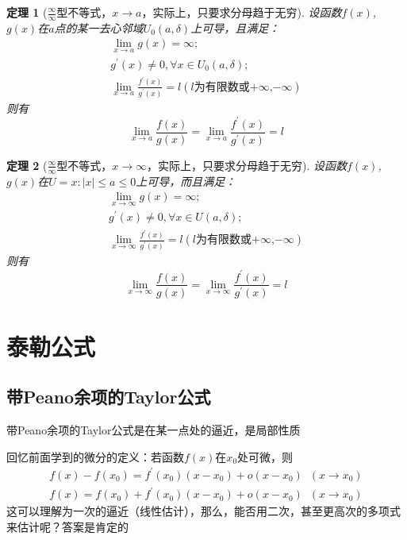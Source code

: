 \documentclass[12pt, a4paper, oneside]{ctexart}
\newtheorem{theorem}{定理}[section]
\begin{document}
\begin{theorem}[$\frac{\infty}{\infty}$型不等式，$x \to a$，实际上，只要求分母趋于无穷]
设函数$f(x)$,$g(x)$在$a$点的某一去心邻域$U_{0}(a,\delta)$上可导，且满足：
\begin{align*}
    \lim\limits_{x\to a}g(x)=\infty;\\
    g^{'}(x)\neq 0,\forall x \in U_{0}(a,\delta);\\
    \lim\limits_{x\to a}\frac{f^{'}(x)}{g^{'}(x)}=l(\mbox{$l$为有限数或$+\infty$,$-\infty$})
\end{align*}
则有
\begin{equation}
    \lim\limits_{x \to a}\frac{f(x)}{g(x)}=\lim\limits_{x \to a}\frac{f^{'}(x)}{g^{'}(x)}=l
\end{equation}
\end{theorem}

\begin{theorem}[$\frac{\infty}{\infty}$型不等式，$x \to \infty$，实际上，只要求分母趋于无穷]
设函数$f(x)$,$g(x)$在$U={x:|x|\leq a \leq 0}$上可导，而且满足：
\begin{align*}
    \lim\limits_{x\to \infty}g(x)=\infty;\\
    g^{'}(x)\neq 0,\forall x \in U(a,\delta);\\
     \lim\limits_{x\to \infty}\frac{f^{'}(x)}{g^{'}(x)}=l(\mbox{$l$为有限数或$+\infty$,$-\infty$})
\end{align*}
则有
\begin{equation}
    \lim\limits_{x \to \infty}\frac{f(x)}{g(x)}=\lim\limits_{x \to \infty}\frac{f^{'}(x)}{g^{'}(x)}=l
\end{equation}
\end{theorem}

\section{泰勒公式}

\subsection{带Peano余项的Taylor公式}

\begin{remark}
带Peano余项的Taylor公式是在某一点处的逼近，是局部性质
\end{remark}

\begin{note}
回忆前面学到的微分的定义：若函数$f(x)$在$x_0$处可微，则
\begin{align*}
    f(x)-f(x_0)=f^{\prime}(x_0)(x-x_0)+o(x-x_0)\;\;(x \to x_0)\\
    f(x)=f(x_0)+f^{\prime}(x_0)(x-x_0)+o(x-x_0)\;\;(x \to x_0)
\end{align*}
这可以理解为一次的逼近（线性估计），那么，能否用二次，甚至更高次的多项式来估计呢？答案是肯定的
\end{note}
\end{document}
